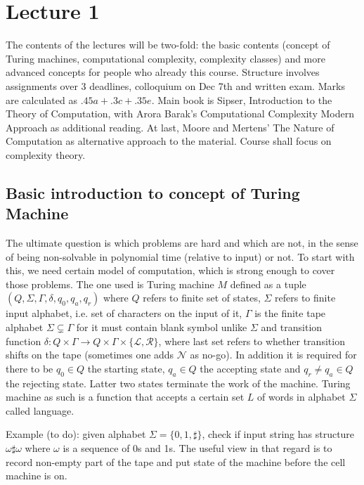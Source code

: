 \documentclass[12pt]{article}
\begin{document}
\section{Lecture 1}
The contents of the lectures will be two-fold: the basic contents (concept of Turing machines, computational complexity, complexity classes) and more advanced concepts for people who already this course. Structure involves assignments over 3 deadlines, colloquium on Dec 7th and written exam. Marks are calculated as \(.45a+.3c+.35e\). Main book is Sipser, Introduction to the Theory of Computation, with Arora Barak's Computational Complexity Modern Approach as additional reading. At last, Moore and Mertens' The Nature of Computation as alternative approach to the material. Course shall focus on complexity theory.

\subsection {Basic introduction to concept of Turing Machine}
The ultimate question is which problems are hard and which are not, in the sense of being non-solvable in polynomial time (relative to input) or not. To start with this, we need certain model of computation, which is strong enough to cover those problems. The one used is Turing machine \(M\) defined as a tuple \((Q,\Sigma,\Gamma,\delta,q_0,q_a,q_r)\) where \(Q\) refers to finite set of states, \(\Sigma\) refers to finite input alphabet, i.e. set of characters on the input of it, \(\Gamma\) is the finite tape alphabet \(\Sigma\subsetneq\Gamma\) for it must contain blank symbol unlike \(\Sigma\) and transition function \(\delta\colon Q\times\Gamma\rightarrow Q\times\Gamma\times\{\mathcal L,\mathcal R\}\), where last set refers to whether transition shifts on the tape (sometimes one adds \(\mathcal N\) as no-go). In addition it is required for there to be \(q_0\in Q\) the starting state, \(q_a\in Q\) the accepting state and \(q_r\neq q_a \in Q\) the rejecting state. Latter two states terminate the work of the machine. Turing machine as such is a function that accepts a certain set \(L\) of words in alphabet \(\Sigma\) called language.

Example (to do): given alphabet \(\Sigma=\{0,1,\sharp\}\), check if input string has structure \(\omega \sharp \omega\) where \(\omega\) is a sequence of 0s and 1s. The useful view in that regard is to record non-empty part of the tape and put state of the machine before the cell machine is on. 
\end{document}
